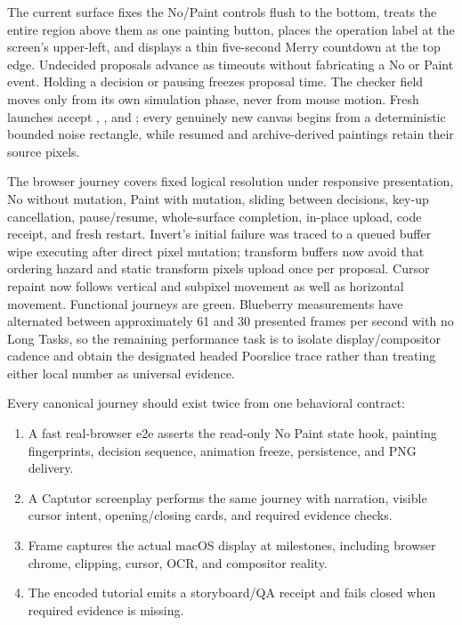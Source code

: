 \documentclass[10pt,letterpaper,twocolumn]{article}
\newcommand{\mono}[1]{\code{#1}}
\begin{document}
The current surface fixes the No/Paint controls flush to the bottom, treats the entire region above them as one painting button, places the operation label at the screen's upper-left, and displays a thin five-second Merry countdown at the top edge. Undecided proposals advance as timeouts without fabricating a No or Paint event. Holding a decision or pausing freezes proposal time. The checker field moves only from its own simulation phase, never from mouse motion. Fresh launches accept \mono{?fresh=1}, \mono{nopaint fresh}, and \mono{/nopaint:fresh}; every genuinely new canvas begins from a deterministic bounded noise rectangle, while resumed and archive-derived paintings retain their source pixels.

The browser journey covers fixed logical resolution under responsive presentation, No without mutation, Paint with mutation, sliding between decisions, key-up cancellation, pause/resume, whole-surface completion, in-place upload, code receipt, and fresh restart. Invert's initial failure was traced to a queued buffer wipe executing after direct pixel mutation; transform buffers now avoid that ordering hazard and static transform pixels upload once per proposal. Cursor repaint now follows vertical and subpixel movement as well as horizontal movement. Functional journeys are green. Blueberry measurements have alternated between approximately 61 and 30 presented frames per second with no Long Tasks, so the remaining performance task is to isolate display/compositor cadence and obtain the designated headed Poorslice trace rather than treating either local number as universal evidence.

Every canonical journey should exist twice from one behavioral contract:

\begin{enumerate}
  \item A fast real-browser e2e asserts the read-only No Paint state hook, painting fingerprints, decision sequence, animation freeze, persistence, and PNG delivery.
  \item A Captutor screenplay performs the same journey with narration, visible cursor intent, opening/closing cards, and required evidence checks.
  \item Frame captures the actual macOS display at milestones, including browser chrome, clipping, cursor, OCR, and compositor reality.
  \item The encoded tutorial emits a storyboard/QA receipt and fails closed when required evidence is missing.
\end{enumerate}
\end{document}

